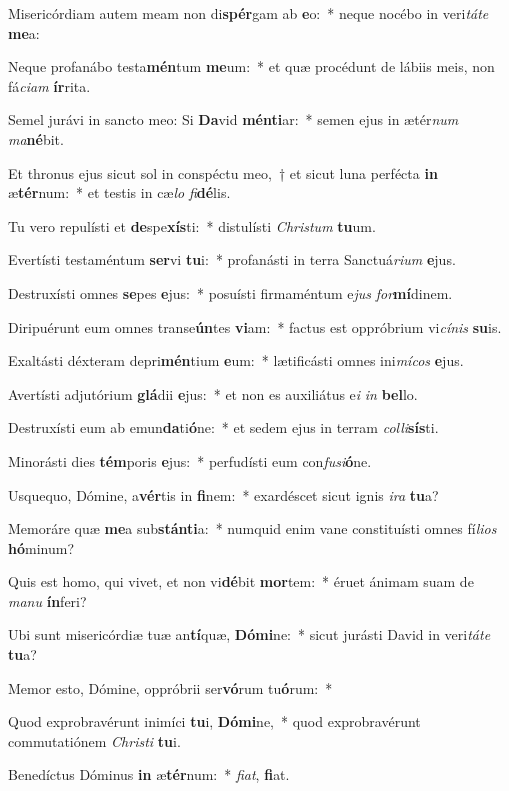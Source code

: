 \item Misericórdiam autem meam non di\textbf{spér}gam ab \textbf{e}o:~* neque nocébo in veri\textit{tá}\textit{te} \textbf{me}a:
\item Neque profanábo testa\textbf{mén}tum \textbf{me}um:~* et quæ procédunt de lábiis meis, non fá\textit{ci}\textit{am} \textbf{ír}rita.
\item Semel jurávi in sancto meo: Si \textbf{Da}vid \textbf{mén}\textbf{ti}ar:~* semen ejus in ætér\textit{num} \textit{ma}\textbf{né}bit.
\item Et thronus ejus sicut sol in conspéctu meo,~† et sicut luna perfécta \textbf{in} æ\textbf{tér}num:~* et testis in cæ\textit{lo} \textit{fi}\textbf{dé}lis.
\item Tu vero repulísti et \textbf{de}spe\textbf{xís}ti:~* distulísti \textit{Chris}\textit{tum} \textbf{tu}um.
\item Evertísti testaméntum \textbf{ser}vi \textbf{tu}i:~* profanásti in terra Sanctuá\textit{ri}\textit{um} \textbf{e}jus.
\item Destruxísti omnes \textbf{se}pes \textbf{e}jus:~* posuísti firmaméntum e\textit{jus} \textit{for}\textbf{mí}dinem.
\item Diripuérunt eum omnes transe\textbf{ún}tes \textbf{vi}am:~* factus est oppróbrium vi\textit{cí}\textit{nis} \textbf{su}is.
\item Exaltásti déxteram depri\textbf{mén}tium \textbf{e}um:~* lætificásti omnes ini\textit{mí}\textit{cos} \textbf{e}jus.
\item Avertísti adjutórium \textbf{glá}dii \textbf{e}jus:~* et non es auxiliátus e\textit{i} \textit{in} \textbf{bel}lo.
\item Destruxísti eum ab emun\textbf{da}ti\textbf{ó}ne:~* et sedem ejus in terram \textit{col}\textit{li}\textbf{sís}ti.
\item Minorásti dies \textbf{tém}poris \textbf{e}jus:~* perfudísti eum con\textit{fu}\textit{si}\textbf{ó}ne.
\item Usquequo, Dómine, a\textbf{vér}tis in \textbf{fi}nem:~* exardéscet sicut ignis \textit{i}\textit{ra} \textbf{tu}a?
\item Memoráre quæ \textbf{me}a sub\textbf{stán}\textbf{ti}a:~* numquid enim vane constituísti omnes fí\textit{li}\textit{os} \textbf{hó}minum?
\item Quis est homo, qui vivet, et non vi\textbf{dé}bit \textbf{mor}tem:~* éruet ánimam suam de \textit{ma}\textit{nu} \textbf{ín}feri?
\item Ubi sunt misericórdiæ tuæ an\textbf{tí}quæ, \textbf{Dó}\textbf{mi}ne:~* sicut jurásti David in veri\textit{tá}\textit{te} \textbf{tu}a?
\item Memor esto, Dómine, oppróbrii ser\textbf{vó}rum tu\textbf{ó}rum:~* 
\item Quod exprobravérunt inimíci \textbf{tu}i, \textbf{Dó}\textbf{mi}ne,~* quod exprobravérunt commutatiónem \textit{Chris}\textit{ti} \textbf{tu}i.
\item Benedíctus Dóminus \textbf{in} æ\textbf{tér}num:~* \textit{fi}\textit{at}, \textbf{fi}at.
